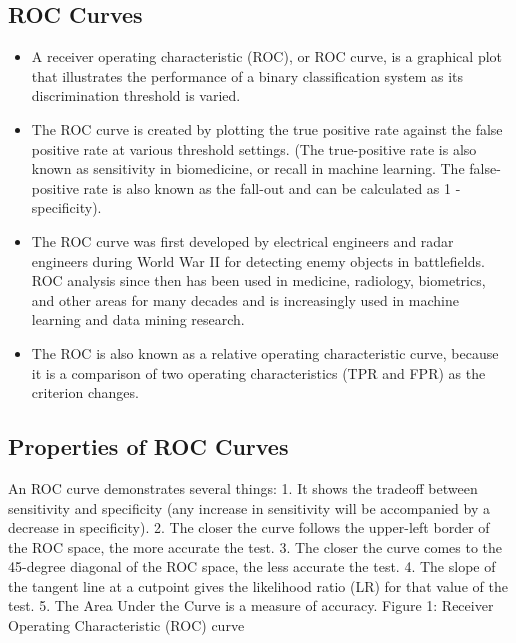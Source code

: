 \documentclass[a4paper,12pt]{article}
\begin{document}
\subsection{ROC Curves}
\begin{itemize}
	\item  A receiver operating characteristic (ROC), or ROC curve, is a graphical plot that illustrates
	the performance of a binary classification system as its discrimination threshold is varied.
	\item  The ROC curve is created by plotting the true positive rate against the false positive rate at
	various threshold settings. (The true-positive rate is also known as sensitivity in biomedicine,
	or recall in machine learning. The false-positive rate is also known as the fall-out and can be
	calculated as 1 - specificity).
	\item  The ROC curve was first developed by electrical engineers and radar engineers during World
	War II for detecting enemy objects in battlefields. ROC analysis since then has been used in
	medicine, radiology, biometrics, and other areas for many decades and is increasingly used
	in machine learning and data mining research.
	\item  The ROC is also known as a relative operating characteristic curve, because it is a comparison
	of two operating characteristics (TPR and FPR) as the criterion changes.
\end{itemize}
\subsection{Properties of ROC Curves}
An ROC curve demonstrates several things:
1. It shows the tradeoff between sensitivity and specificity (any increase in sensitivity will be
accompanied by a decrease in specificity).
2. The closer the curve follows the upper-left border of the ROC space, the more accurate the
test.
3. The closer the curve comes to the 45-degree diagonal of the ROC space, the less accurate the
test.
4. The slope of the tangent line at a cutpoint gives the likelihood ratio (LR) for that value of
the test.
5. The Area Under the Curve is a measure of accuracy.
Figure 1: Receiver Operating Characteristic (ROC) curve
\end{document}
